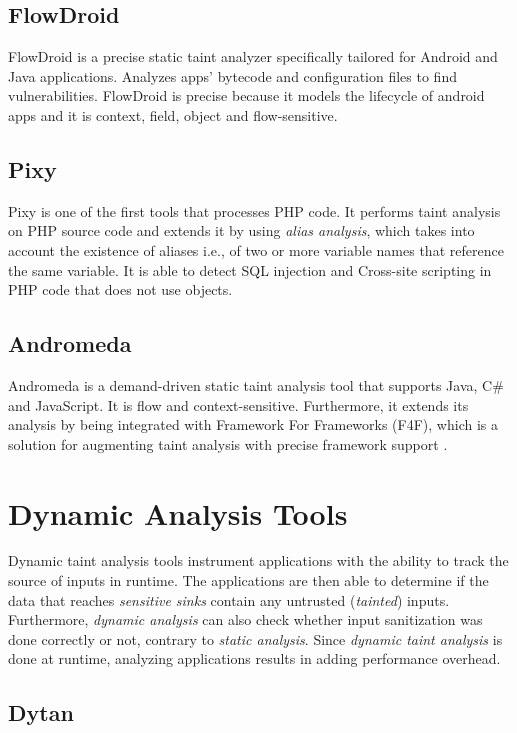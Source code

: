 \subsection{FlowDroid} FlowDroid \cite{arzt2014flowdroid} is a precise static taint analyzer specifically tailored for Android and Java applications. Analyzes apps' bytecode and configuration files to find vulnerabilities. FlowDroid is precise because it models the lifecycle of android apps and it is context, field, object and flow-sensitive. 


\subsection{Pixy}
Pixy \cite{jovanovic2006pixy} is one of the first tools that processes PHP code. It performs taint analysis on PHP source code and extends it by using \textit{alias analysis}, which takes into account the existence of aliases i.e., of two or more variable names that reference the same variable. It is able to detect SQL injection and Cross-site scripting in PHP code that does not use objects.

\subsection{Andromeda}
Andromeda \cite{tripp2013andromeda} is a demand-driven static taint analysis tool that supports Java, C\# and JavaScript. It is flow and context-sensitive. Furthermore, it extends its analysis by being integrated with Framework For Frameworks (F4F), which is a solution for augmenting taint analysis with precise framework support \cite{sridharan2011f4f}. 


\section{Dynamic Analysis Tools} 
\label{dynamic}
Dynamic taint analysis tools instrument applications with the ability to track the source of inputs in runtime. The applications are then able to determine if the data that reaches \textit{sensitive sinks} contain any untrusted (\textit{tainted}) inputs. Furthermore, \textit{dynamic analysis} can also check whether input sanitization was done correctly or not, contrary to \textit{static analysis}. Since \textit{dynamic taint analysis} is done at runtime, analyzing applications results in adding performance overhead.


\subsection{Dytan} 

